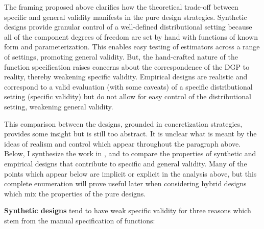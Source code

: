 \documentclass[../main.tex]{subfiles}
\begin{document}
\vspace{\baselineskip}
The framing proposed above clarifies how the theoretical trade-off between specific and general validity manifests in the pure design strategies. Synthetic designs provide granular control of a well-defined distributional setting because all of the component degrees of freedom are set by hand with functions of known form and parameterization. This enables easy testing of estimators across a range of settings, promoting general validity. But, the hand-crafted nature of the function specification raises concerns about the correspondence of the DGP to reality, thereby weakening specific validity. Empirical designs are realistic and correspond to a valid evaluation (with some caveats) of a specific distributional setting (specific validity) but do not allow for easy control of the distributional setting, weakening general validity.\par


\vspace{\baselineskip}
This comparison between the designs, grounded in concretization strategies, provides some insight but is still too abstract. It is unclear what is meant by the ideas of realism and control which appear throughout the paragraph above. Below, I synthesize the work in \textcite{Paxton2001MonteImplementation}, \textcite{Huber2013TheScore} and \textcite{Dorie2019Automated1} to compare the properties of synthetic and empirical designs that contribute to specific and general validity. Many of the points which appear below are implicit or explicit in the analysis above, but this complete enumeration will prove useful later when considering hybrid designs which mix the properties of the pure designs.\par


\vspace{\baselineskip}
\textbf{Synthetic designs} tend to have weak specific validity for three reasons which stem from the manual specification of functions:\par
\end{document}
